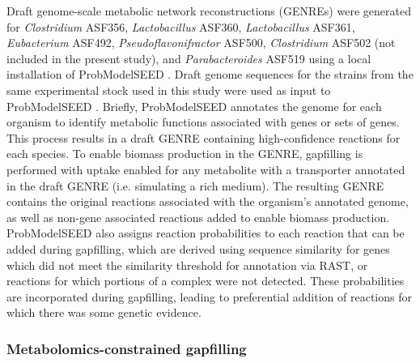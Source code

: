 \documentclass[11pt,twocolumn,notitlepage,openany,twoside]{book}
\begin{document}
\begin{refsection}
Draft genome-scale metabolic network reconstructions (GENREs) were generated for \textit{Clostridium} ASF356, \textit{Lactobacillus} ASF360, \textit{Lactobacillus} ASF361, \textit{Eubacterium} ASF492, \textit{Pseudoflavonifractor} ASF500, \textit{Clostridium} ASF502 (not included in the present study), and \textit{Parabacteroides} ASF519 using a local installation of ProbModelSEED \cite{Benedict2014-yo,Henry2010-um}. Draft genome sequences for the strains from the same experimental stock used in this study were used as input to ProbModelSEED \cite{Wannemuehler2014-cn}. Briefly, ProbModelSEED annotates the genome for each organism to identify metabolic functions associated with genes or sets of genes. This process results in a draft GENRE containing high-confidence reactions for each species. To enable biomass production in the GENRE, gapfilling is performed with uptake enabled for any metabolite with a transporter annotated in the draft GENRE (i.e. simulating a rich medium). The resulting GENRE contains the original reactions associated with the organism’s annotated genome, as well as non-gene associated reactions added to enable biomass production. ProbModelSEED also assigns reaction probabilities to each reaction that can be added during gapfilling, which are derived using sequence similarity for genes which did not meet the similarity threshold for annotation via RAST, or reactions for which portions of a complex were not detected. These probabilities are incorporated during gapfilling, leading to preferential addition of reactions for which there was some genetic evidence.

\subsubsection{Metabolomics-constrained gapfilling}


\end{refsection}
\end{document}
